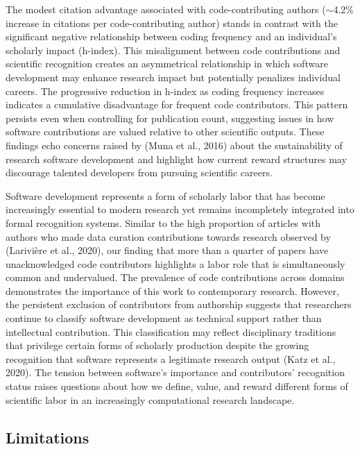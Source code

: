 \documentclass[
  number,
  3p,
  onecolumn]{elsarticle}
\begin{document}
The modest citation advantage associated with code-contributing authors
($\sim$4.2\% increase in citations per code-contributing
author) stands in contrast with the significant negative relationship
between coding frequency and an individual's scholarly impact (h-index).
This misalignment between code contributions and scientific recognition
creates an asymmetrical relationship in which software development may
enhance research impact but potentially penalizes individual careers.
The progressive reduction in h-index as coding frequency increases
indicates a cumulative disadvantage for frequent code contributors. This
pattern persists even when controlling for publication count, suggesting
issues in how software contributions are valued relative to other
scientific outputs. These findings echo concerns raised by (Muna et al.,
2016) about the sustainability of research software development and
highlight how current reward structures may discourage talented
developers from pursuing scientific careers.

Software development represents a form of scholarly labor that has
become increasingly essential to modern research yet remains
incompletely integrated into formal recognition systems. Similar to the
high proportion of articles with authors who made data curation
contributions towards research observed by (Larivière et al., 2020), our
finding that more than a quarter of papers have unacknowledged code
contributors highlights a labor role that is simultaneously common and
undervalued. The prevalence of code contributions across domains
demonstrates the importance of this work to contemporary research.
However, the persistent exclusion of contributors from authorship
suggests that researchers continue to classify software development as
technical support rather than intellectual contribution. This
classification may reflect disciplinary traditions that privilege
certain forms of scholarly production despite the growing recognition
that software represents a legitimate research output (Katz et al.,
2020). The tension between software's importance and contributors'
recognition status raises questions about how we define, value, and
reward different forms of scientific labor in an increasingly
computational research landscape.

\subsection{Limitations}\label{limitations}
\end{document}

